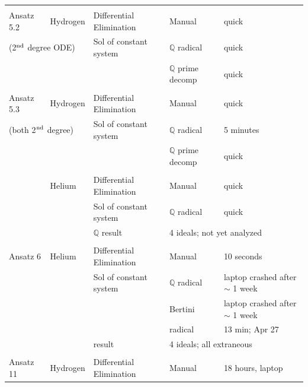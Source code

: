 \documentclass{article}
\begin{document}
\begin{longtable}{lllll}
           &               &                         &                      &\\
Ansatz 5.2 &Hydrogen       &Differential Elimination &Manual                &quick\\
\multicolumn{2}{l}{(2$^{\rm nd}$ degree ODE)} &Sol of constant system   &$\mathbb{Q}$ radical            &quick\\
           &               &                         &$\mathbb{Q}$ prime decomp        &quick\\
           &               &                         &                      &\\
Ansatz 5.3 &Hydrogen       &Differential Elimination &Manual                &quick\\
\multicolumn{2}{l}{(both 2$^{\rm nd}$ degree)}   &Sol of constant system   &$\mathbb{Q}$ radical            &5 minutes\\
           &               &                         &$\mathbb{Q}$ prime decomp        &quick\\
           &               &                         &                      &\\
           &Helium         &Differential Elimination &Manual                &quick\\
           &               &Sol of constant system   &$\mathbb{Q}$ radical            &quick\\
           &               &$\mathbb{Q}$ result                 &\multicolumn{2}{l}{4 ideals; not yet analyzed}\\
           &               &                         &                      &\\
Ansatz 6   &Helium         &Differential Elimination &Manual                &10 seconds\\
           &               &Sol of constant system   &$\mathbb{Q}$ radical             &laptop crashed after $\sim$ 1 week\\
           &               &                         &Bertini               &laptop crashed after $\sim$ 1 week\\
           &               &                         &\R32003 radical        &13 min; Apr 27\\
           &               &\R32003 result            &\multicolumn{2}{l}{4 ideals; all extraneous}\\
           &               &                         &                      &\\
Ansatz 11  &Hydrogen       &Differential Elimination &Manual                &18 hours, laptop\\

\end{longtable}
\end{document}
